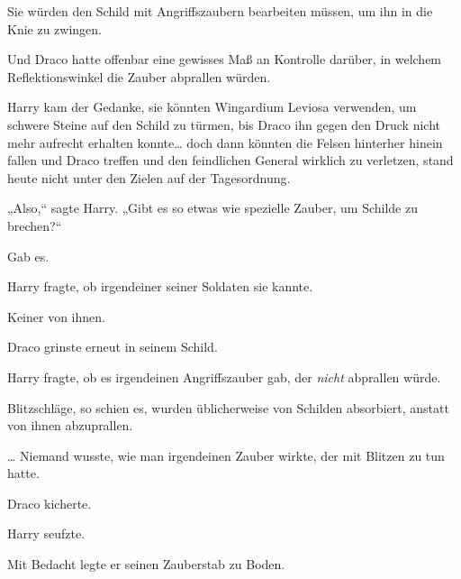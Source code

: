 Sie würden den Schild mit Angriffszaubern bearbeiten müssen, um ihn in die Knie zu zwingen.

Und Draco hatte offenbar eine gewisses Maß an Kontrolle darüber, in welchem Reflektionswinkel die Zauber abprallen würden.

Harry kam der Gedanke, sie könnten Wingardium Leviosa verwenden, um schwere Steine auf den Schild zu türmen, bis Draco ihn gegen den Druck nicht mehr aufrecht erhalten konnte… doch dann könnten die Felsen hinterher hinein fallen und Draco treffen und den feindlichen General wirklich zu verletzen, stand heute nicht unter den Zielen auf der Tagesordnung.

„Also,“ sagte Harry. „Gibt es so etwas wie spezielle Zauber, um Schilde zu brechen?“

Gab es.

Harry fragte, ob irgendeiner seiner Soldaten sie kannte.

Keiner von ihnen.

Draco grinste erneut in seinem Schild.

Harry fragte, ob es irgendeinen Angriffszauber gab, der \emph{nicht} abprallen würde.

Blitzschläge, so schien es, wurden üblicherweise von Schilden absorbiert, anstatt von ihnen abzuprallen.

… Niemand wusste, wie man irgendeinen Zauber wirkte, der mit Blitzen zu tun hatte.

Draco kicherte.

Harry seufzte.

Mit Bedacht legte er seinen Zauberstab zu Boden.

